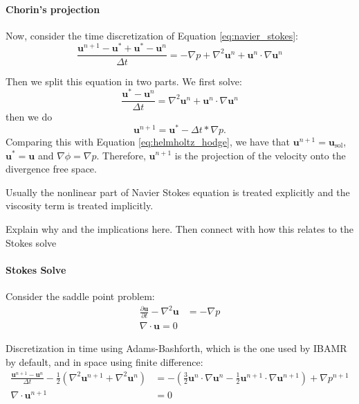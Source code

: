 \documentclass[12pt,a4paper,twoside]{article}
\begin{document}
\paragraph{Chorin's projection}
Now, consider the time discretization of Equation \eqref{eq:navier_stokes}: 
\begin{equation*}
    \frac{\bm{u}^{n+1} - \bm{u}^{*} +\bm{u}^{*} - \bm{u}^n}{\Delta t} = - \nabla p + \nabla^2 \bm{u}^n+ \bm{u}^n\cdot \nabla \bm{u}^n 
\end{equation*}

Then we split this equation in two parts. 
We first solve:
\begin{equation*}
    \frac{\bm{u}^{*} - \bm{u}^n}{\Delta t} =  \nabla^2 \bm{u}^n+ \bm{u}^n\cdot \nabla \bm{u}^n 
\end{equation*}
then we do 
\begin{equation*}
    \bm{u}^{n+1} =  \bm{u}^{*}-\Delta t *  \nabla p.
\end{equation*}
Comparing this with Equation \eqref{eq:helmholtz_hodge}, we have that $\bm{u}^{n+1}=\bm{u}_\text{sol}$, $\bm{u}^{*}=\bm{u}$ and $\nabla \phi = \nabla p$. 
Therefore, $\bm{u}^{n+1}$ is the projection of the velocity onto the divergence free space.

Usually the nonlinear part of Navier Stokes equation is treated explicitly and the viscosity term is treated implicitly. 

{\color{red} Explain why and the implications here. Then connect with how this relates to the Stokes solve}

\paragraph{Stokes Solve}
Consider the saddle point problem: 
\begin{equation*}
\begin{split}
       \frac{\partial \bm{u}}{\partial t} - \nabla^2 \bm{u} &= -\nabla p \\
       \nabla \cdot \bm{u} =0
\end{split}
\end{equation*}

Discretization in time using Adams-Bashforth, {\color{red} which is the one used by IBAMR by default}, and in space using finite difference:
\begin{equation*}
\begin{split}
        \frac{\bm{u}^{n+1} - \bm{u}^{n}}{\Delta t} - \frac{1}{2}(\nabla^2\bm{u}^{n+1}+\nabla^2\bm{u}^{n}) &= -\left( \frac{3}{2}\bm{u}^n \cdot \nabla\bm{u}^{n} - \frac{1}{2}\bm{u}^{n+1} \cdot \nabla\bm{u}^{n+1} \right) + \nabla p^{n+1}\\
           \nabla \cdot \bm{u}^{n+1} &=0
\end{split}
\end{equation*}
\end{document}
